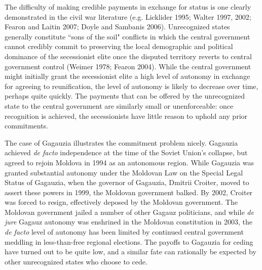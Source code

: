 \documentclass[11pt,letterpaper, notitlepage]{article}
\begin{document}
The difficulty of making credible payments in exchange for status is one clearly demonstrated in the civil war literature (e.g. Licklider 1995; Walter 1997, 2002; Fearon and Laitin 2007; Doyle and Sambanis 2006). Unrecognized states generally constitute ``sons of the soil" conflicts in which the central government cannot credibly commit to preserving the local demographic and political dominance of the secessionist elite once the disputed territory reverts to central government control (Weimer 1978; Fearon 2004). While the central government might initially grant the secessionist elite a high level of autonomy in exchange for agreeing to reunification, the level of autonomy is likely to decrease over time, perhaps quite quickly. The payments that can be offered by the unrecognized state to the central government are similarly small or unenforceable: once recognition is achieved, the secessionists have little reason to uphold any prior commitments. 


The case of Gagauzia illustrates the commitment problem nicely. Gagauzia achieved \emph{de facto} independence at the time of the Soviet Union's collapse, but agreed to rejoin Moldova in 1994 as an autonomous region. While Gagauzia was granted substantial autonomy under the Moldovan Law on the Special Legal Status of Gagauzia, when the governor of Gagauzia, Dmitrii Croiter, moved to assert these powers in 1999, the Moldovan government balked. By 2002, Croiter was forced to resign, effectively deposed by the Moldovan government. The Moldovan government jailed a number of other Gagauz politicians, and while \emph{de jure} Gagauz autonomy was enshrined in the Moldovan constitution in 2003, the \emph{de facto} level of autonomy has been limited by continued central government meddling in less-than-free regional elections. The payoffs to Gagauzia for ceding have turned out to be quite low, and a similar fate can rationally be expected by other unrecognized states who choose to cede.
\end{document}
